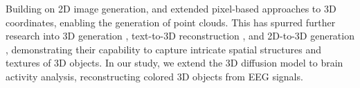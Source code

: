 Building on 2D image generation, \cite{luo2021diffusion} and \cite{zhou20213d} extended pixel-based approaches to 3D coordinates, enabling the generation of point clouds. This has spurred further research into 3D generation \cite{ren2024tiger,vahdat2022lion}, text-to-3D reconstruction \cite{poole2022dreamfusion,nichol2022point}, and 2D-to-3D generation \cite{melas2023pc2,wu2023sketch,long2024wonder3d}, demonstrating their capability to capture intricate spatial structures and textures of 3D objects.
In our study, we extend the 3D diffusion model to brain activity analysis, reconstructing colored 3D objects from EEG signals.